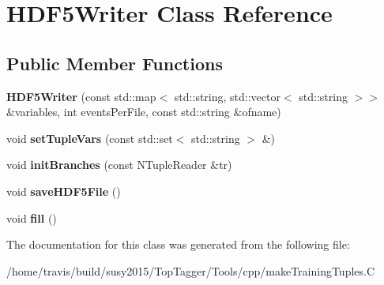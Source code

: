 \hypertarget{classHDF5Writer}{\section{H\-D\-F5\-Writer Class Reference}
\label{classHDF5Writer}
}
\subsection*{Public Member Functions}
\begin{DoxyCompactItemize}
\item 
\hypertarget{classHDF5Writer_ad8e416d1f0a705baf7af1307df1bd095}{{\bfseries H\-D\-F5\-Writer} (const std\-::map$<$ std\-::string, std\-::vector$<$ std\-::string $>$$>$ \&variables, int events\-Per\-File, const std\-::string \&ofname)}\label{classHDF5Writer_ad8e416d1f0a705baf7af1307df1bd095}

\item 
\hypertarget{classHDF5Writer_a636afc5a3f1d26c84eec5975e200418d}{void {\bfseries set\-Tuple\-Vars} (const std\-::set$<$ std\-::string $>$ \&)}\label{classHDF5Writer_a636afc5a3f1d26c84eec5975e200418d}

\item 
\hypertarget{classHDF5Writer_af0e59c14065285d91bc8e5dad4bfd7f9}{void {\bfseries init\-Branches} (const N\-Tuple\-Reader \&tr)}\label{classHDF5Writer_af0e59c14065285d91bc8e5dad4bfd7f9}

\item 
\hypertarget{classHDF5Writer_adbd14eba2d2d401d635ba6cbce691afe}{void {\bfseries save\-H\-D\-F5\-File} ()}\label{classHDF5Writer_adbd14eba2d2d401d635ba6cbce691afe}

\item 
\hypertarget{classHDF5Writer_af88c6deb22f565aa60a27dc5476a59e7}{void {\bfseries fill} ()}\label{classHDF5Writer_af88c6deb22f565aa60a27dc5476a59e7}

\end{DoxyCompactItemize}


The documentation for this class was generated from the following file\-:\begin{DoxyCompactItemize}
\item 
/home/travis/build/susy2015/\-Top\-Tagger/\-Tools/cpp/make\-Training\-Tuples.\-C\end{DoxyCompactItemize}
